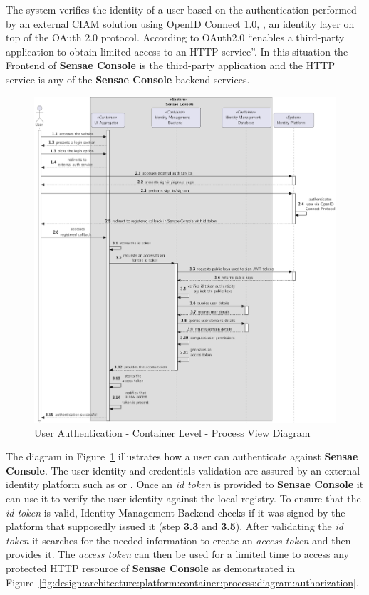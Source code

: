 The system verifies the identity of a user based on the authentication performed by an external \gls{CIAM} solution using OpenID Connect 1.0, \cite{openid}, an identity layer on top of the OAuth 2.0 protocol. According to \cite{oauth} OAuth2.0 ``enables a third-party application to obtain limited access to an HTTP service''. In this situation the Frontend of \textbf{Sensae Console} is the third-party application and the HTTP service is any of the \textbf{Sensae Console} backend services.

\begin{figure}
   \centering
   \includegraphics[page=1,width=\columnwidth]{assets/diagrams/design/architectural/level2/process/user-authentication.pdf}
   \caption[User Authentication - Container Level - Process View Diagram]{User Authentication - Container Level - Process View Diagram}
   \label{fig:design:architecture:platform:container:process:diagram:authentication}
\end{figure}

The diagram in Figure~\ref{fig:design:architecture:platform:container:process:diagram:authentication} illustrates how a user can authenticate against \textbf{Sensae Console}.
The user identity and credentials validation are assured by an external identity platform such as  or . Once an \textit{id token} is provided to \textbf{Sensae Console} it can use it to verify the user identity against the local registry. To ensure that the \textit{id token} is valid, Identity Management Backend checks if it was signed by the platform that supposedly issued it (step \textbf{3.3} and \textbf{3.5}). After validating the \textit{id token} it searches for the needed information to create an \textit{access token} and then provides it. The \textit{access token} can then be used for a limited time to access any protected HTTP resource of \textbf{Sensae Console} as demonstrated in Figure~\ref{fig:design:architecture:platform:container:process:diagram:authorization}.

